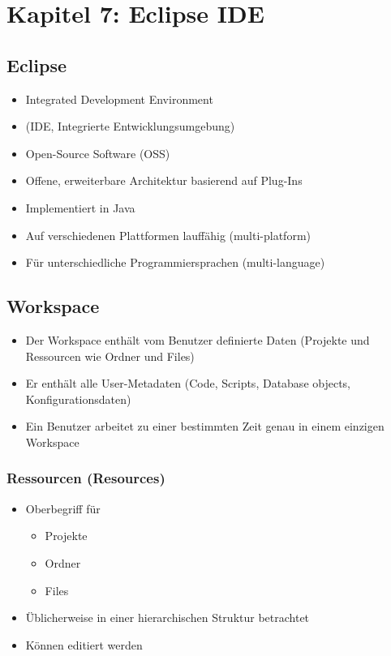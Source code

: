 
\section{Kapitel 7: Eclipse IDE}
\label{sec:Eclipse IDE}

\subsection{Eclipse}
\label{sec:Eclipse}
\begin{itemize}
	\item Integrated Development Environment
	\item[\-] (IDE, Integrierte Entwicklungsumgebung)
	\item Open-Source Software (OSS)
	\item Offene, erweiterbare Architektur basierend auf Plug-Ins
	\item Implementiert in Java
	\item Auf verschiedenen Plattformen lauffähig (multi-platform)
	\item Für unterschiedliche Programmiersprachen (multi-language)
\end{itemize}

\subsection{Workspace}
\label{sec:Workspace}
\begin{itemize}
	\item Der Workspace enthält vom Benutzer definierte Daten (Projekte und Ressourcen wie Ordner und Files)
	\item Er enthält alle User-Metadaten (Code, Scripts, Database objects, Konfigurationsdaten)
	\item Ein Benutzer arbeitet zu einer bestimmten Zeit genau in einem einzigen Workspace
\end{itemize}

\subsubsection{Ressourcen (Resources)}
\label{sec:Ressourcen (Resources)}
\begin{itemize}
	\item Oberbegriff für
	\begin{itemize}
		\item Projekte
		\item Ordner
		\item Files
	\end{itemize}
	\item Üblicherweise in einer hierarchischen Struktur betrachtet
	\item Können editiert werden
\end{itemize}

